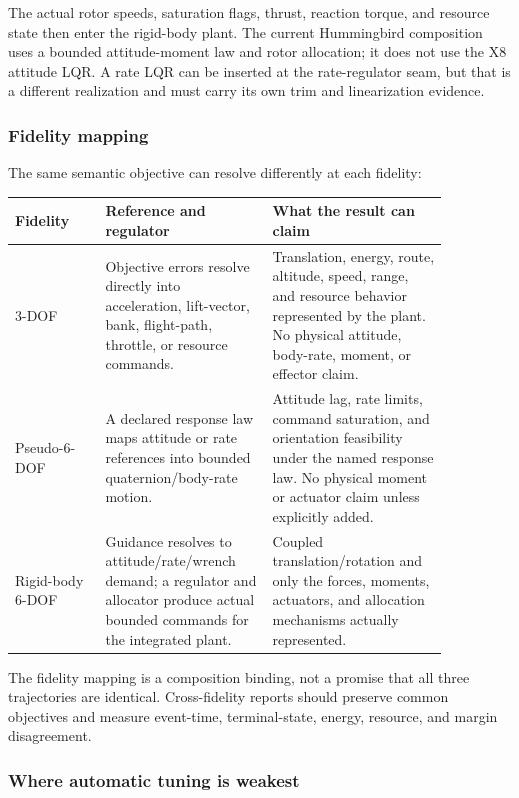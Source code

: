\documentclass[11pt]{article}
\begin{document}
The actual rotor speeds, saturation flags, thrust, reaction torque, and
resource state then enter the rigid-body plant. The current Hummingbird
composition uses a bounded attitude-moment law and rotor allocation; it does
not use the X8 attitude LQR. A rate LQR can be inserted at the rate-regulator
seam, but that is a different realization and must carry its own trim and
linearization evidence.

\subsubsection{Fidelity mapping}

The same semantic objective can resolve differently at each fidelity:

\begin{longtable}{p{0.18\linewidth}p{0.33\linewidth}p{0.35\linewidth}}
\toprule
\textbf{Fidelity} & \textbf{Reference and regulator} & \textbf{What the result can claim} \\
\midrule
\endhead
3-DOF & Objective errors resolve directly into acceleration, lift-vector, bank, flight-path, throttle, or resource commands. & Translation, energy, route, altitude, speed, range, and resource behavior represented by the plant. No physical attitude, body-rate, moment, or effector claim. \\
Pseudo-6-DOF & A declared response law maps attitude or rate references into bounded quaternion/body-rate motion. & Attitude lag, rate limits, command saturation, and orientation feasibility under the named response law. No physical moment or actuator claim unless explicitly added. \\
Rigid-body 6-DOF & Guidance resolves to attitude/rate/wrench demand; a regulator and allocator produce actual bounded commands for the integrated plant. & Coupled translation/rotation and only the forces, moments, actuators, and allocation mechanisms actually represented. \\
\bottomrule
\end{longtable}

The fidelity mapping is a composition binding, not a promise that all three
trajectories are identical. Cross-fidelity reports should preserve common
objectives and measure event-time, terminal-state, energy, resource, and
margin disagreement.

\subsubsection{Where automatic tuning is weakest}
\end{document}
